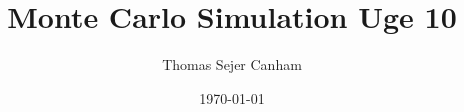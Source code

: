 \documentclass{article}
\title{Monte Carlo Simulation Uge 10}
\author{Thomas Sejer Canham}
\date{\today}
\theoremstyle{definition}
\theoremstyle{remark}
\begin{document}

\begin{titlepage}

    \maketitle
    \thispagestyle{empty}

\end{titlepage}
\end{document}
